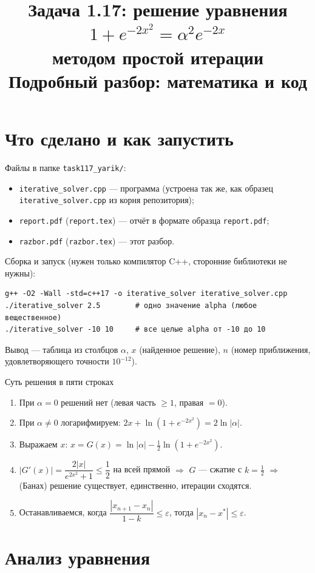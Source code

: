 \documentclass[11pt,a4paper]{article}
\title{\textbf{Задача 1.17: решение уравнения $1+e^{-2x^2}=\alpha^2e^{-2x}$\\ методом простой итерации}\\[4pt]\large Подробный разбор: математика и код}
\date{}
\begin{document}
\maketitle
\tableofcontents

\section{Что сделано и как запустить}
Файлы в папке \texttt{task117\_yarik/}:
\begin{itemize}
\item \texttt{iterative\_solver.cpp} — программа (устроена так же, как образец \texttt{iterative\_solver.cpp} из корня репозитория);
\item \texttt{report.pdf} (\texttt{report.tex}) — отчёт в формате образца \texttt{report.pdf};
\item \texttt{razbor.pdf} (\texttt{razbor.tex}) — этот разбор.
\end{itemize}
Сборка и запуск (нужен только компилятор C++, сторонние библиотеки не нужны):
\begin{Verbatim}[frame=single,fontsize=\small]
g++ -O2 -Wall -std=c++17 -o iterative_solver iterative_solver.cpp
./iterative_solver 2.5        # одно значение alpha (любое вещественное)
./iterative_solver -10 10     # все целые alpha от -10 до 10
\end{Verbatim}
Вывод — таблица из столбцов $\alpha$, $x$ (найденное решение), $n$ (номер приближения, удовлетворяющего точности $10^{-12}$).

\begin{key}{Суть решения в пяти строках}
\begin{enumerate}
\item При $\alpha=0$ решений нет (левая часть $\ge1$, правая $=0$).
\item При $\alpha\ne0$ логарифмируем: $2x+\ln(1+e^{-2x^2})=2\ln|\alpha|$.
\item Выражаем $x$: $x=G(x)=\ln|\alpha|-\tfrac12\ln(1+e^{-2x^2})$.
\item $|G'(x)|=\dfrac{2|x|}{e^{2x^2}+1}\le\dfrac12$ на всей прямой $\Rightarrow$ $G$ — сжатие с $k=\tfrac12$ $\Rightarrow$ (Банах) решение существует, единственно, итерации сходятся.
\item Останавливаемся, когда $\dfrac{|x_{n+1}-x_n|}{1-k}\le\varepsilon$, тогда $|x_n-x^*|\le\varepsilon$.
\end{enumerate}
\end{key}

\section{Анализ уравнения}
\end{document}

